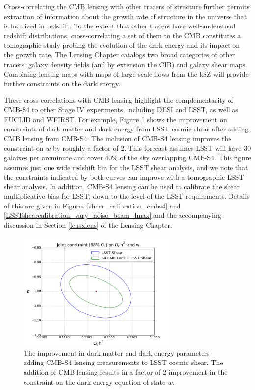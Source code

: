 Cross-correlating the CMB lensing with other tracers of structure further permits extraction of information about the growth rate of structure in the universe that is localized in redshift.  To the extent that other tracers have well-understood redshift distributions, cross-correlating a set of them to the CMB constitutes a tomographic study probing the evolution of the dark energy and its impact on the growth rate. The Lensing Chapter catalogs two broad categories of other tracers: galaxy density fields (and by extension the CIB) and galaxy shear maps. Combining lensing maps with maps of large scale flows from the kSZ will provide further constraints on the dark energy.

These cross-correlations with CMB lensing highlight the complementarity of CMB-S4 to other Stage IV experiments, including DESI and LSST, as well as EUCLID and WFIRST. 
For example, Figure \ref{LSSTdarkEnergy} shows the improvement on constraints of dark matter and dark energy from LSST cosmic shear after adding CMB lensing from CMB-S4.  The inclusion of CMB-S4 lensing improves the constraint on $w$ by roughly a factor of 2.  This forecast assumes LSST will have 30 galaixes per arcminute and cover 40\% of the sky overlapping CMB-S4.  This figure assumes just one wide redshift bin for the LSST shear analysis, and we note that the constraints indicated by both curves can improve with a tomographic LSST shear analysis.   In addition, CMB-S4 lensing can be used to calibrate the shear multiplicative bias for LSST, down to the level of the LSST requirements.  Details of this are given in Figures \ref{shear_calibration_cmbs4} and \ref{LSSTshearcalibration_vary_noise_beam_lmax} and the accompanying discussion in Section \ref{lensxlens} of the Lensing Chapter.

\begin{figure}[htbp]
\centering
\includegraphics[width=0.7\textwidth]{CMBLensing/darkEnergy.png}
\caption{The improvement in dark matter and dark energy parameters adding CMB-S4 lensing measurements to LSST cosmic shear.  The addition of CMB lensing results in a factor of 2 improvement in the constraint on the dark energy equation of state $w$.}
\label{LSSTdarkEnergy}
\end{figure}


